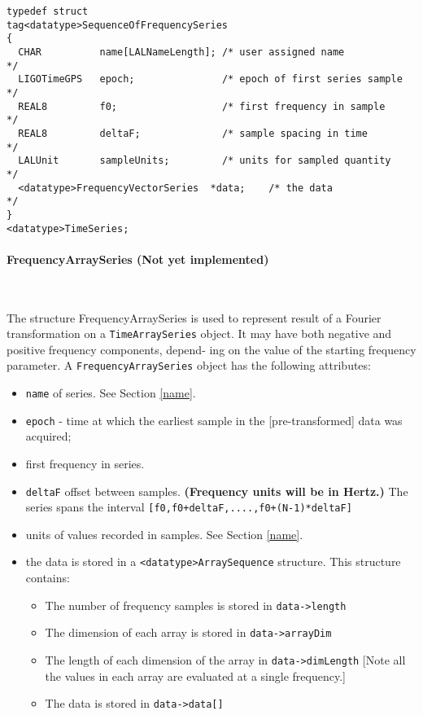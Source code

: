 \documentclass[]{ligodcc}
\renewcommand{\texttt}[1]{{\ttfamily\color{blue}#1}}
\begin{document}
{\footnotesize
\begin{verbatim}
typedef struct
tag<datatype>SequenceOfFrequencySeries
{
  CHAR          name[LALNameLength]; /* user assigned name           */
  LIGOTimeGPS   epoch;               /* epoch of first series sample */
  REAL8         f0;                  /* first frequency in sample    */
  REAL8         deltaF;              /* sample spacing in time       */
  LALUnit       sampleUnits;         /* units for sampled quantity   */
  <datatype>FrequencyVectorSeries  *data;    /* the data                     */
}
<datatype>TimeSeries;
\end{verbatim}}

\paragraph{{\texttt {FrequencyArraySeries}} {\bf (Not yet implemented)} }~


The structure FrequencyArraySeries is used to represent result of a
Fourier transformation on a {\tt TimeArraySeries} object. It may have both
negative and positive frequency components, depend- ing on the value
of the starting frequency parameter. A {\tt FrequencyArraySeries} object has
the following attributes:


\begin{itemize}
\vspace{-0.15in}
\item
{\tt name} of series. See Section \ref{name}.
\vspace{-0.15in}
\item
{\tt epoch}  -  time at which the earliest sample in the [pre-transformed]
data was acquired;
\vspace{-0.15in}
\item
first frequency in series. 
\vspace{-0.15in}
\item
{\tt deltaF} offset between samples.  {\bf (Frequency units will be in Hertz.)}
The series spans the interval {\tt [f0,f0+deltaF,....,f0+(N-1)*deltaF]}
\vspace{-0.15in}
\item
units of values recorded in samples. See Section \ref{name}.
\vspace{-0.15in}
\item
the data is stored in a {\tt <datatype>ArraySequence}  structure. This
structure contains:
\begin{itemize}
\vspace{-0.1in}
\item
The number of frequency  samples is stored in {\tt data->length}
\vspace{-0.1in}
\item
The dimension of each array is stored in {\tt data->arrayDim}
\vspace{-0.1in}
\item
The length of each dimension of the array in {\tt data->dimLength}
[Note all the values in each array are evaluated at a single frequency.]
\vspace{-0.1in}
\item
The data is stored in {\tt data->data[]}
\end{itemize}
\end{itemize}
\end{document}
